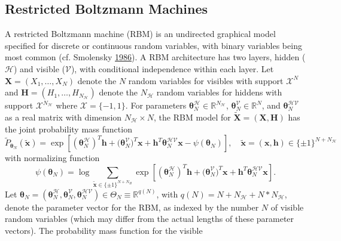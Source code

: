 \documentclass[]{article}
\theoremstyle{definition}
\begin{document}
\subsection{Restricted Boltzmann
Machines}\label{restricted-boltzmann-machines}

A restricted Boltzmann machine (RBM) is an undirected graphical model
specified for discrete or continuous random variables, with binary
variables being most common (cf. Smolensky
\protect\hyperlink{ref-smolensky1986information}{1986}). A RBM
architecture has two layers, hidden (\(\mathcal{H}\)) and visible
(\(\mathcal{V}\)), with conditional independence within each layer. Let
\(\boldsymbol X = (X_1,\ldots,X_N)\) denote the \(N\) random variables
for visibles with support \(\mathcal{X}^N\) and
\(\boldsymbol H = (H_1,\ldots,H_{N_\mathcal{H}})\) denote the
\(N_\mathcal{H}\) random variables for hiddens with support
\(\mathcal{X}^{N_\mathcal{H}}\) where \(\mathcal{X} = \{-1,1\}\). For
parameters
\(\boldsymbol \theta_N^{\mathcal{H}} \in \mathbb{R}^{N_\mathcal{H}}\),
\(\boldsymbol \theta_N^{\mathcal{V}}\in \mathbb{R}^N\), and
\(\boldsymbol \theta_N^{\mathcal{HV}}\) as a real matrix with dimension
\(N_\mathcal{H} \times N\), the RBM model for
\(\tilde{\boldsymbol X}=(\boldsymbol X,\boldsymbol H)\) has the joint
probability mass function
\begin{equation}
\label{eq:RBM1}
\tilde{P}_{\boldsymbol \theta_N} (\tilde{\boldsymbol x}) = \exp\left[ (\boldsymbol \theta_N^{\mathcal{H}})^T \boldsymbol h + \boldsymbol (\boldsymbol \theta_N^{\mathcal{V}})^T \boldsymbol x + \boldsymbol h^T  \boldsymbol\theta_N^{\mathcal{HV}} \boldsymbol x - \psi(\boldsymbol \theta_N)\right], \quad \tilde{\boldsymbol x} = (\boldsymbol x, \boldsymbol h) \in \{\pm 1\}^{N+N_\mathcal{H}}
\end{equation}
with normalizing function \[
\psi(\boldsymbol \theta_N) = \log \sum_{\tilde{\boldsymbol x} \in \{\pm 1\}^{N+N_H} } \exp\left[ (\boldsymbol \theta_N^{\mathcal{H}})^T \boldsymbol h + \boldsymbol (\boldsymbol \theta_N^{\mathcal{V}})^T \boldsymbol x + \boldsymbol h^T  \boldsymbol\theta_N^{\mathcal{HV}} \boldsymbol x\right].
\] Let
\(\boldsymbol \theta_N = (\boldsymbol \theta_N^{\mathcal{H}}, \boldsymbol \theta_N^{\mathcal{V}}, \boldsymbol\theta_N^{\mathcal{HV}} ) \in \Theta_N \equiv \mathbb{R}^{q(N)}\),
with \(q(N) = N + N_\mathcal{H} + N*N_\mathcal{H}\), denote the
parameter vector for the RBM, as indexed by the number \(N\) of visible
random variables (which may differ from the actual lengths of these
parameter vectors). The probability mass function for the visible
\end{document}
